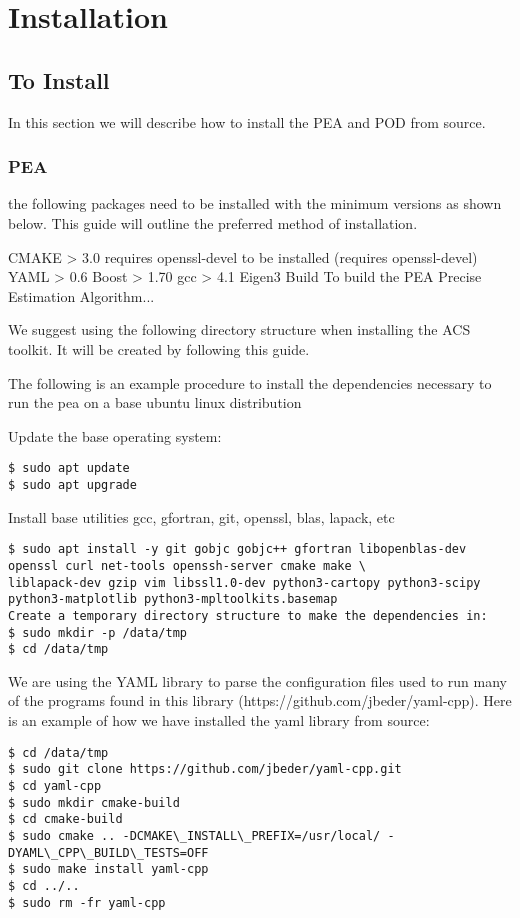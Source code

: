 \chapter{Installation}
\label{ch:installation}


\section{To Install} 

In this section we will describe how to install the PEA and POD from source.

\subsection{PEA}


 the following packages need to be installed with the minimum versions as shown below. This guide will outline the preferred method of installation.

CMAKE  > 3.0 requires openssl-devel to be installed (requires openssl-devel)
YAML   > 0.6
Boost  > 1.70
gcc    > 4.1
Eigen3
Build
To build the PEA Precise Estimation Algorithm...

We suggest using the following directory structure when installing the ACS toolkit. It will be created by following this guide.


The following is an example procedure to install the dependencies necessary to run the pea on a base ubuntu linux distribution

Update the base operating system:
\begin{verbatim}
$ sudo apt update
$ sudo apt upgrade
\end{verbatim}
Install base utilities gcc, gfortran, git, openssl, blas, lapack, etc
\begin{verbatim}
$ sudo apt install -y git gobjc gobjc++ gfortran libopenblas-dev openssl curl net-tools openssh-server cmake make \
liblapack-dev gzip vim libssl1.0-dev python3-cartopy python3-scipy python3-matplotlib python3-mpltoolkits.basemap
Create a temporary directory structure to make the dependencies in:
$ sudo mkdir -p /data/tmp
$ cd /data/tmp
\end{verbatim}

We are using the YAML library to parse the configuration files used to run many of the programs found in this library (https://github.com/jbeder/yaml-cpp). Here is an example of how we have installed the yaml library from source:
\begin{verbatim}
$ cd /data/tmp
$ sudo git clone https://github.com/jbeder/yaml-cpp.git
$ cd yaml-cpp
$ sudo mkdir cmake-build
$ cd cmake-build
$ sudo cmake .. -DCMAKE\_INSTALL\_PREFIX=/usr/local/ -DYAML\_CPP\_BUILD\_TESTS=OFF
$ sudo make install yaml-cpp
$ cd ../..
$ sudo rm -fr yaml-cpp
\end{verbatim}

